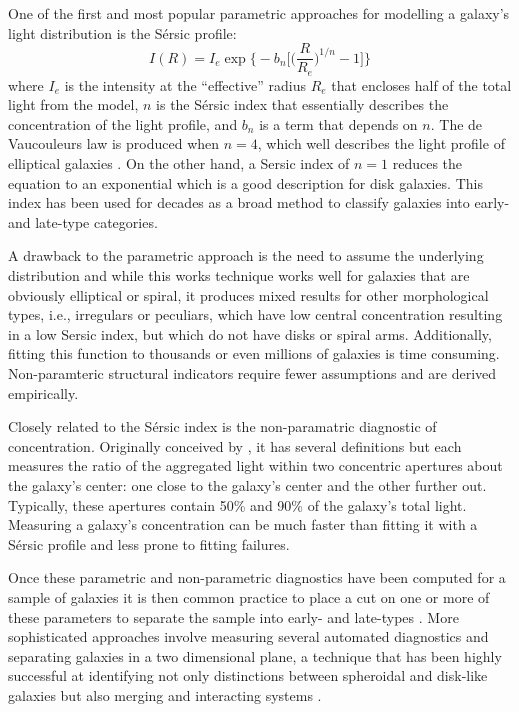 One of the first and most popular parametric approaches for modelling a galaxy's light distribution is the S\'ersic profile:
\begin{equation}
I(R) = I_e \exp \Big\{-b_n\Big[\Big(\frac{R}{R_e}\Big)^{1/n}-1\Big]\Big\}
\end{equation}
where $I_e$ is the intensity at the ``effective'' radius $R_e$ that encloses half of the total light from the model, $n$ is the S\'ersic index that essentially describes the concentration of the light profile, and $b_n$ is a term that depends on $n$. The de Vaucouleurs law is produced when $n=4$, which well describes the light profile of elliptical galaxies \citep{???}. On the other hand, a Sersic index of $n=1$ reduces the equation to an exponential which is a good description for disk galaxies. This index has been used for decades as a broad method to classify galaxies into early- and late-type categories. 

A drawback to the parametric approach is the need to assume the underlying distribution and while this works technique works well for galaxies that are obviously elliptical or spiral, it produces mixed results for other morphological types, i.e., irregulars or peculiars, which have low central concentration resulting in a low Sersic index, but which do not have disks or spiral arms. Additionally, fitting this function to thousands or even millions of galaxies is time consuming. Non-paramteric structural indicators require fewer assumptions and are derived empirically.

Closely related to the S\'ersic index is the non-paramatric diagnostic of concentration. Originally conceived by \cite{Abraham1996}, it has several definitions but each measures the ratio of the aggregated light within two concentric apertures about the galaxy's center: one close to the galaxy's center and the other further out. Typically, these apertures contain 50\% and 90\% of the galaxy's total light. Measuring a galaxy's concentration can be much faster than fitting it with a S\'ersic profile and less prone to fitting failures. 

Once these parametric and non-parametric diagnostics have been computed for a sample of galaxies it is then common practice to place a cut on one or more of these parameters to separate the sample into early- and late-types \citep{Shen2003}. More sophisticated approaches involve measuring several automated diagnostics and separating galaxies in a two dimensional plane, a technique that has been highly successful at identifying not only distinctions between spheroidal and disk-like galaxies but also merging and interacting systems \citep{Lotz2004, Conselice2000, Conselice2003,Freeman2013}. 


